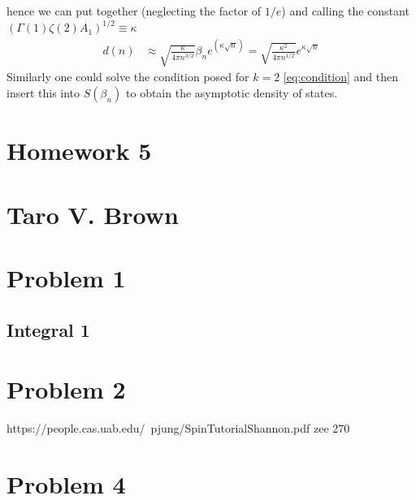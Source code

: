 \documentclass[a4paper,12pt]{article}
\begin{document}
hence we can put together (neglecting the factor of $1/e$) and calling the constant $(\Gamma(1)\zeta(2)A_1)^{1/2}\equiv\kappa$
\begin{equation}
	\begin{aligned}
		d(n)&\approx\sqrt{\frac{\kappa}{4\pi n^{3/2}}}\beta_n e^{(\kappa \sqrt{n})}=
		\sqrt{\frac{\kappa^2}{4\pi n^{1/2}}} e^{\kappa \sqrt{n}}
	\end{aligned}
\end{equation}
Similarly one could solve the condition posed for $k=2$ \eqref{eq:condition} and then insert this into $S(\beta_n)$ to obtain the asymptotic density of states.
\newpage
\section*{Homework 5\\\\
	Taro V. Brown}\vspace*{1cm}
\section*{Problem 1}
\subsection*{Integral 1}
\section*{Problem 2}
https://people.cas.uab.edu/~pjung/SpinTutorialShannon.pdf
zee 270
\section*{Problem 4}
\end{document}
